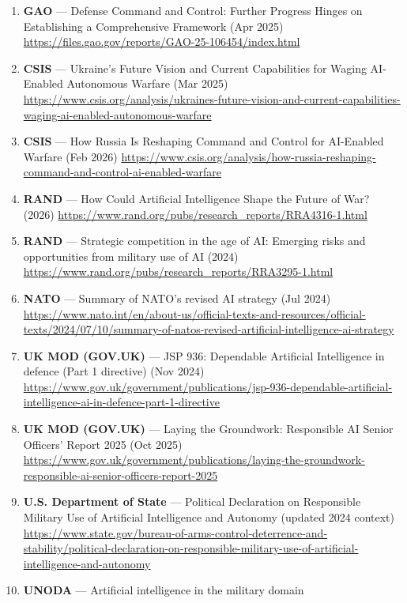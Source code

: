 \documentclass[
]{article}
\providecommand{\tightlist}{%
  \setlength{\itemsep}{0pt}\setlength{\parskip}{0pt}}
\begin{document}
\begin{enumerate}
\def\labelenumi{\arabic{enumi}.}
\setcounter{enumi}{34}
\tightlist
\item
  \textbf{GAO} --- Defense Command and Control: Further Progress Hinges
  on Establishing a Comprehensive Framework (Apr 2025)
  \url{https://files.gao.gov/reports/GAO-25-106454/index.html}
\item
  \textbf{CSIS} --- Ukraine's Future Vision and Current Capabilities for
  Waging AI-Enabled Autonomous Warfare (Mar 2025)
  \url{https://www.csis.org/analysis/ukraines-future-vision-and-current-capabilities-waging-ai-enabled-autonomous-warfare}
\item
  \textbf{CSIS} --- How Russia Is Reshaping Command and Control for
  AI-Enabled Warfare (Feb 2026)
  \url{https://www.csis.org/analysis/how-russia-reshaping-command-and-control-ai-enabled-warfare}
\item
  \textbf{RAND} --- How Could Artificial Intelligence Shape the Future
  of War? (2026)
  \url{https://www.rand.org/pubs/research_reports/RRA4316-1.html}
\item
  \textbf{RAND} --- Strategic competition in the age of AI: Emerging
  risks and opportunities from military use of AI (2024)
  \url{https://www.rand.org/pubs/research_reports/RRA3295-1.html}
\item
  \textbf{NATO} --- Summary of NATO's revised AI strategy (Jul 2024)
  \url{https://www.nato.int/en/about-us/official-texts-and-resources/official-texts/2024/07/10/summary-of-natos-revised-artificial-intelligence-ai-strategy}
\item
  \textbf{UK MOD (GOV.UK)} --- JSP 936: Dependable Artificial
  Intelligence in defence (Part 1 directive) (Nov 2024)
  \url{https://www.gov.uk/government/publications/jsp-936-dependable-artificial-intelligence-ai-in-defence-part-1-directive}
\item
  \textbf{UK MOD (GOV.UK)} --- Laying the Groundwork: Responsible AI
  Senior Officers' Report 2025 (Oct 2025)
  \url{https://www.gov.uk/government/publications/laying-the-groundwork-responsible-ai-senior-officers-report-2025}
\item
  \textbf{U.S. Department of State} --- Political Declaration on
  Responsible Military Use of Artificial Intelligence and Autonomy
  (updated 2024 context)
  \url{https://www.state.gov/bureau-of-arms-control-deterrence-and-stability/political-declaration-on-responsible-military-use-of-artificial-intelligence-and-autonomy}
\item
  \textbf{UNODA} --- Artificial intelligence in the military domain

\end{enumerate}
\end{document}
